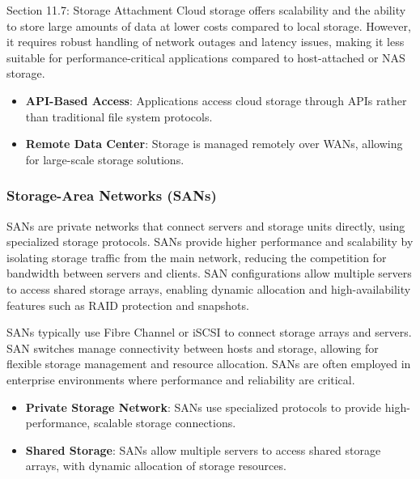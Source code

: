 \begin{notes}{Section 11.7: Storage Attachment}
    Cloud storage offers scalability and the ability to store large amounts of data at lower costs compared to local storage. However, it requires robust handling of network outages and latency issues, 
    making it less suitable for performance-critical applications compared to host-attached or NAS storage.
    
    \begin{highlight}
    
        \begin{itemize}
            \item \textbf{API-Based Access}: Applications access cloud storage through APIs rather than traditional file system protocols.
            \item \textbf{Remote Data Center}: Storage is managed remotely over WANs, allowing for large-scale storage solutions.
        \end{itemize}
    
    \end{highlight}
    
    \subsubsection*{Storage-Area Networks (SANs)}
    
    SANs are private networks that connect servers and storage units directly, using specialized storage protocols. SANs provide higher performance and scalability by isolating storage traffic from the 
    main network, reducing the competition for bandwidth between servers and clients. SAN configurations allow multiple servers to access shared storage arrays, enabling dynamic allocation and 
    high-availability features such as RAID protection and snapshots.
    
    SANs typically use Fibre Channel or iSCSI to connect storage arrays and servers. SAN switches manage connectivity between hosts and storage, allowing for flexible storage management and resource 
    allocation. SANs are often employed in enterprise environments where performance and reliability are critical.
    
    \begin{highlight}
    
        \begin{itemize}
            \item \textbf{Private Storage Network}: SANs use specialized protocols to provide high-performance, scalable storage connections.
            \item \textbf{Shared Storage}: SANs allow multiple servers to access shared storage arrays, with dynamic allocation of storage resources.
        \end{itemize}
    

\end{highlight}
\end{notes}
